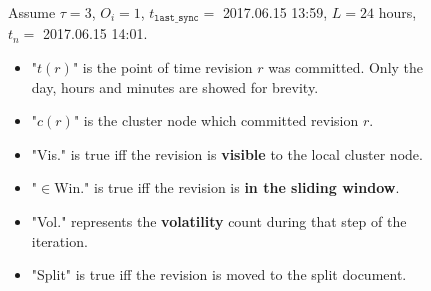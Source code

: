 \documentclass[abstracton,12pt]{scrreprt}
\begin{document}
\begin{figure}
    Assume $\tau = 3$, $O_i = 1$, $t_{\texttt{last\_sync}} = $ {\footnotesize 2017.06.15 13:59}, $L = 24$ hours, $t_n = $ {\footnotesize 2017.06.15 14:01}.
    \begin{itemize}
        \item "$t(r)$" is the point of time revision $r$ was committed. Only the day, hours and minutes are showed for brevity.
        \item "$c(r)$" is the cluster node which committed revision $r$.
        \item "Vis." is true iff the revision is \textbf{visible} to the local cluster node.
        \item "$\in$Win." is true iff the revision is \textbf{in the sliding window}.
        \item "Vol." represents the \textbf{volatility} count during that step of the iteration. 
        \item "Split" is true iff the revision is moved to the split document.
    \end{itemize}
\end{figure}
\end{document}
